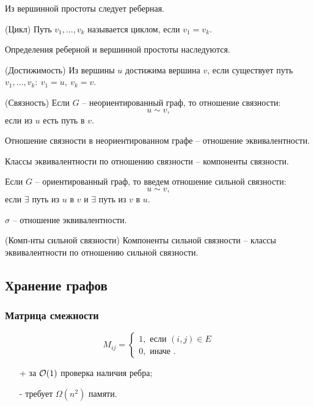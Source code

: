\begin{multicols}{2}
    \begin{note}{}{}
        Из вершинной простоты следует реберная.
    \end{note} 
    \begin{definition}{(Цикл)}{}
        Путь $v_1, \ldots, v_k$ называется циклом, если $v_1 = v_k.$
    \end{definition}
    \begin{note}{}{}
        Определения реберной и вершинной простоты наследуются.
    \end{note}
    \begin{definition}{(Достижимость)}{}
        Из вершины $u$ достижима вершина $v$, если существует путь $v_1, \ldots, v_k:\ v_1 = u, \ v_k = v.$
    \end{definition}
    \begin{definition}{(Связность)}{}
        Если $G$ -- неориентированный граф, то отношение связности: 
        \[
            u\sim v,  
        \]
        если из $u$ есть путь в $v$.
    \end{definition}
    \begin{note}{}{}
        Отношение связности в неориентированном графе -- отношение эквивалентности.
    \end{note}
    \begin{definition}{}{}
        Классы эквивалентности по отношению связности -- компоненты связности.
    \end{definition}
    \begin{definition}{}{}
        Если $G$ -- ориентированный граф, то введем отношение сильной связности:
        \[
            u\sim v,
        \]
        если $\exists$ путь из $u$ в $v$ и $\exists$ путь из $v$ в $u$.
    \end{definition}
    \begin{note}{}{}
        $\sigma$ -- отношение эквивалентности.
    \end{note}
    \begin{definition}{(Комп-нты сильной связности)}{}
        Компоненты сильной связности -- классы эквивалентности по отношению сильной связности.
    \end{definition}
    \subsection*{Хранение графов}
    \subsubsection*{Матрица смежности}
    \[
        M_{ij} = \left\{ 
            \begin{array}{l}
                1, \text{ если } (i,j) \in E\\
                0, \text{ иначе }.
            \end{array}
        \right.
    \]
    \begin{itemize}
        \item[+] за ${\cal O}(1)$ проверка наличия ребра;
        \item[-]  требует $\Omega(n^2)$ памяти.
    \end{itemize}

\end{multicols}
